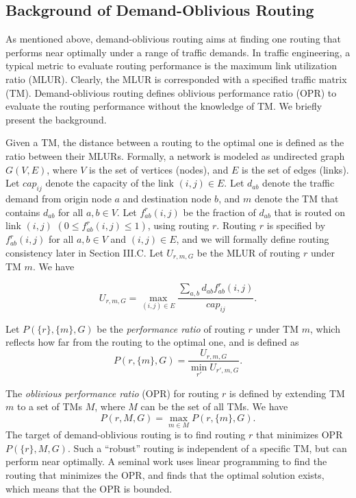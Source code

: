 \documentclass[conference]{IEEEtran}
\begin{document}
\subsection{Background of Demand-Oblivious Routing}

As mentioned above, demand-oblivious routing aims at finding one routing that performs near optimally under a range of traffic demands. In traffic engineering, a typical metric to evaluate routing performance is the maximum link utilization ratio (MLUR). Clearly, the MLUR is corresponded with a specified traffic matrix (TM). Demand-oblivious routing defines oblivious performance ratio (OPR) to evaluate the routing performance without the knowledge of TM. We briefly present the background.

Given a TM, the distance between a routing to the optimal one is defined as the ratio between their MLURs. Formally, a network is modeled as undirected graph $G(V, E)$, where $V$ is the set of vertices (nodes), and $E$ is the set of edges (links). Let $cap_{ij}$ denote the capacity of the link $(i, j) \in E$. Let $d_{ab}$ denote the traffic demand from origin node $a$ and destination node $b$, and $m$ denote the TM that contains $d_{ab}$ for all $a, b \in V$. Let $f^r_{ab}(i,j)$ be the fraction of $d_{ab}$ that is routed on link $(i, j)$ $(0 \leq f^r_{ab}(i,j) \leq 1)$, using routing $r$. Routing $r$ is specified by $f^r_{ab}(i,j)$ for all $a, b \in V$ and $(i, j) \in E$, and we will formally define routing consistency later in Section III.C. Let $U_{r, m, G}$ be the MLUR of routing $r$ under TM $m$. We have

\begin{equation}
\label{equation_U_rmG}
	U_{r, m, G} = \max_{(i,j)\in E} \frac{\sum_{a,b} d_{ab}f^r_{ab}(i,j)}{cap_{ij}}.
\end{equation}

Let $P(\{ r \},\{ m \}, G)$ be the \emph{performance ratio} of routing $r$ under TM $m$, which reflects how far from the routing to the optimal one, and is defined as
\begin{equation}
\label{equation_P_rmG}
	P(r,\{ m \}, G) = \frac{U_{r,m,G}}{\min_{r'} U_{r', m, G}}.
\end{equation}

The \emph{oblivious performance ratio} (OPR) for routing $r$ is defined by extending TM $m$ to a set of TMs $M$, where $M$ can be the set of all TMs. We have
\begin{equation}
\label{equation_P_rMG}
	P(r, M, G) = \max_{m\in M} P(r, \{ m \}, G).
\end{equation}
The target of demand-oblivious routing is to find routing $r$ that minimizes OPR $P(\{ r \}, M, G)$. Such a ``robust'' routing is independent of a specific TM, but can perform near optimally. A seminal work \cite{networking:oblivious} uses linear programming to find the routing that minimizes the OPR, and finds that the optimal solution exists, which means that the OPR is bounded.
\end{document}
